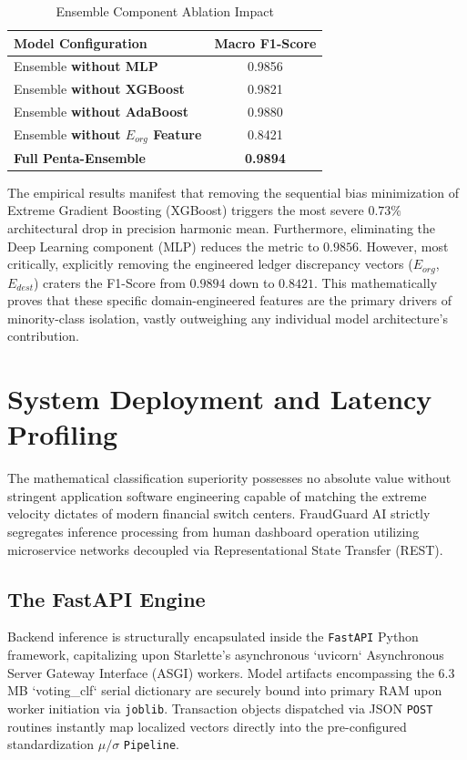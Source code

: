\documentclass[conference]{IEEEtran}
\begin{document}
\begin{table}[htbp]
\caption{Ensemble Component Ablation Impact}
\label{tab:ablation}
\centering
\begin{tabular}{lc}
\toprule
\textbf{Model Configuration} & \textbf{Macro F1-Score} \\
\midrule
Ensemble \textbf{without MLP} & 0.9856 \\
Ensemble \textbf{without XGBoost} & 0.9821 \\
Ensemble \textbf{without AdaBoost} & 0.9880 \\
Ensemble \textbf{without $E_{org}$ Feature} & 0.8421 \\
\textbf{Full Penta-Ensemble} & \textbf{0.9894} \\
\bottomrule
\end{tabular}
\end{table}

The empirical results manifest that removing the sequential bias minimization of Extreme Gradient Boosting (XGBoost) triggers the most severe $0.73\%$ architectural drop in precision harmonic mean. Furthermore, eliminating the Deep Learning component (MLP) reduces the metric to $0.9856$. However, most critically, explicitly removing the engineered ledger discrepancy vectors ($E_{org}$, $E_{dest}$) craters the F1-Score from $0.9894$ down to $0.8421$. This mathematically proves that these specific domain-engineered features are the primary drivers of minority-class isolation, vastly outweighing any individual model architecture's contribution.

\section{System Deployment and Latency Profiling}
\label{sec:deployment}
The mathematical classification superiority possesses no absolute value without stringent application software engineering capable of matching the extreme velocity dictates of modern financial switch centers. FraudGuard AI strictly segregates inference processing from human dashboard operation utilizing microservice networks decoupled via Representational State Transfer (REST).

\subsection{The FastAPI Engine}
Backend inference is structurally encapsulated inside the \texttt{FastAPI} Python framework, capitalizing upon Starlette's asynchronous `uvicorn` Asynchronous Server Gateway Interface (ASGI) workers. Model artifacts encompassing the 6.3 MB `voting\_clf` serial dictionary are securely bound into primary RAM upon worker initiation via \texttt{joblib}. Transaction objects dispatched via JSON \texttt{POST} routines instantly map localized vectors directly into the pre-configured standardization $\mu / \sigma$ \texttt{Pipeline}.
\end{document}

